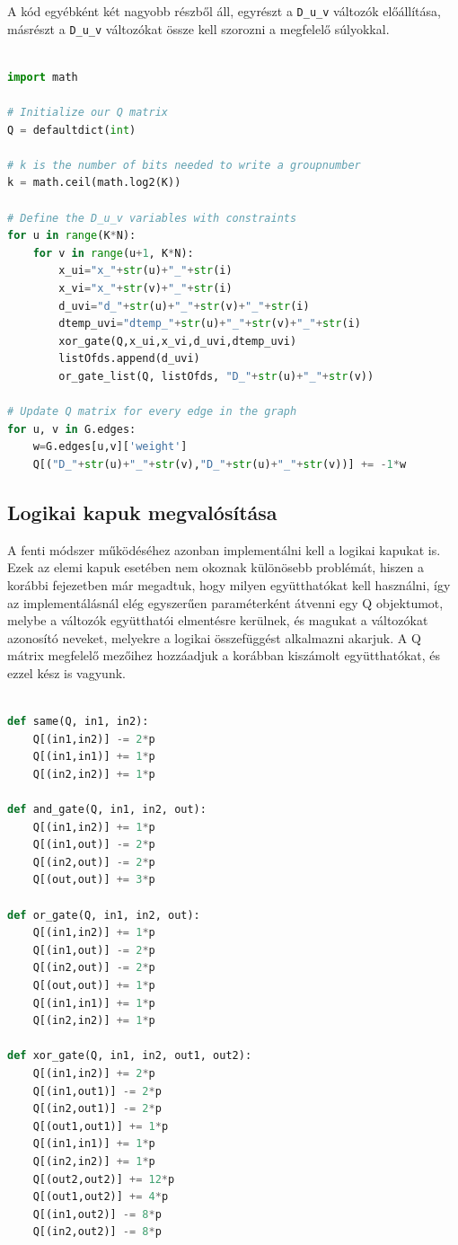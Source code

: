 A kód egyébként két nagyobb részből áll, egyrészt a \verb+D_u_v+ változók előállítása, másrészt a  \verb+D_u_v+ változókat össze kell szorozni a megfelelő súlyokkal.

\begin{lstlisting}[language=python,caption=Max-K-cut QUBO (bináris kódolás),label=code:maxKCutQUBOBinary]

import math

# Initialize our Q matrix
Q = defaultdict(int)

# k is the number of bits needed to write a groupnumber
k = math.ceil(math.log2(K))

# Define the D_u_v variables with constraints
for u in range(K*N):
	for v in range(u+1, K*N):
		x_ui="x_"+str(u)+"_"+str(i)
		x_vi="x_"+str(v)+"_"+str(i)
		d_uvi="d_"+str(u)+"_"+str(v)+"_"+str(i)
		dtemp_uvi="dtemp_"+str(u)+"_"+str(v)+"_"+str(i)
		xor_gate(Q,x_ui,x_vi,d_uvi,dtemp_uvi)
		listOfds.append(d_uvi)
		or_gate_list(Q, listOfds, "D_"+str(u)+"_"+str(v))

# Update Q matrix for every edge in the graph
for u, v in G.edges:
	w=G.edges[u,v]['weight']
	Q[("D_"+str(u)+"_"+str(v),"D_"+str(u)+"_"+str(v))] += -1*w

\end{lstlisting}

\subsection{Logikai kapuk megvalósítása}

A fenti módszer működéséhez azonban implementálni kell a logikai kapukat is.
Ezek az elemi kapuk esetében nem okoznak különösebb problémát, hiszen a korábbi fejezetben már megadtuk, hogy milyen együtthatókat kell használni, így az implementálásnál elég egyszerűen paraméterként átvenni egy Q objektumot, melybe a változók együtthatói elmentésre kerülnek, és magukat a változókat azonosító neveket, melyekre a logikai összefüggést alkalmazni akarjuk. A Q mátrix megfelelő mezőihez hozzáadjuk a korábban kiszámolt együtthatókat, és ezzel kész is vagyunk.

\begin{lstlisting}[language=python,caption=Elemi kapuk,label=code:ElementaryGates]
	
def same(Q, in1, in2):
	Q[(in1,in2)] -= 2*p
	Q[(in1,in1)] += 1*p
	Q[(in2,in2)] += 1*p

def and_gate(Q, in1, in2, out):
	Q[(in1,in2)] += 1*p
	Q[(in1,out)] -= 2*p
	Q[(in2,out)] -= 2*p
	Q[(out,out)] += 3*p

def or_gate(Q, in1, in2, out):
	Q[(in1,in2)] += 1*p
	Q[(in1,out)] -= 2*p
	Q[(in2,out)] -= 2*p
	Q[(out,out)] += 1*p
	Q[(in1,in1)] += 1*p
	Q[(in2,in2)] += 1*p

def xor_gate(Q, in1, in2, out1, out2):
	Q[(in1,in2)] += 2*p
	Q[(in1,out1)] -= 2*p
	Q[(in2,out1)] -= 2*p
	Q[(out1,out1)] += 1*p
	Q[(in1,in1)] += 1*p
	Q[(in2,in2)] += 1*p
	Q[(out2,out2)] += 12*p
	Q[(out1,out2)] += 4*p
	Q[(in1,out2)] -= 8*p
	Q[(in2,out2)] -= 8*p
	
\end{lstlisting}

